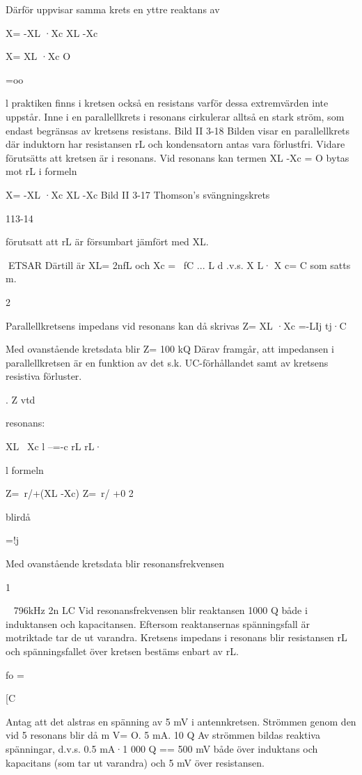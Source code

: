 {Därför uppvisar samma krets en yttre
reaktans av

X= -XL ·Xc
XL -Xc

X= XL ·Xc
O

=oo

l praktiken finns i kretsen också en
resistans varför dessa extremvärden inte
uppstår. Inne i en parallellkrets i resonans cirkulerar alltså en stark ström, som
endast begränsas av kretsens resistans.
Bild II 3-18
Bilden visar en parallellkrets där
induktorn har resistansen rL och kondensatorn antas vara förlustfri. Vidare
förutsätts att kretsen är i resonans.
Vid resonans kan termen XL -Xc = O
bytas mot rL i formeln

X= -XL ·Xc
XL -Xc
Bild II 3-17 Thomson's svängningskrets

113-14

förutsatt att rL är försumbart jämfört med
XL.

ETSAR
Därtill är XL= 2nfL och Xc = ~fC
...
L
d .v.s. X L· X c= C som satts m.

2

Parallellkretsens impedans vid resonans kan
då skrivas
Z= XL ·Xc =-LIj
tj·C

Med ovanstående kretsdata blir Z= 100 kQ
Därav framgår, att impedansen i parallellkretsen är en funktion av det s.k. UC-förhållandet samt av kretsens resistiva förluster.

.
Z vtd

resonans:

XL~ Xc
l
--=-c
rL
rL·

l formeln

Z=~r/+(XL -Xc)
Z=~r/ +0 2

blirdå

=!j

Med ovanstående kretsdata blir resonansfrekvensen

1

~ 796kHz
2n LC
Vid resonansfrekvensen blir reaktansen
1000 Q både i induktansen och kapacitansen. Eftersom reaktansernas spänningsfall
är motriktade tar de ut varandra. Kretsens
impedans i resonans blir resistansen rL och
spänningsfallet över kretsen bestäms enbart av rL.

fo =

{[C

Antag att det alstras en spänning av 5 mV
i antennkretsen. Strömmen genom den vid
5
resonans blir då
m V= O. 5 mA.
10 Q
Av strömmen bildas reaktiva spänningar,
d.v.s. 0.5 mA·1 000 Q == 500 mV både över
induktans och kapacitans (som tar ut varandra) och 5 mV över resistansen.

}}

